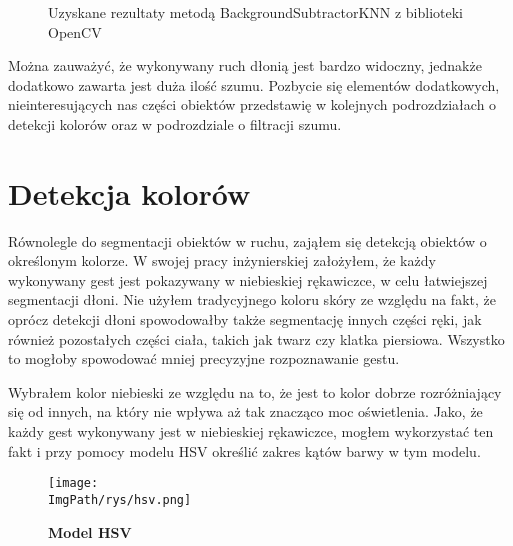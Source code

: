 \documentclass[a4paper,12pt,twoside,openany]{report}
\newcommand{\ImgPath}{.}
\begin{document}
\begin{figure}[H]
	\centering
	\caption{Uzyskane rezultaty metodą BackgroundSubtractorKNN z biblioteki OpenCV}
\end{figure}


Można zauważyć, że wykonywany ruch dłonią jest bardzo widoczny, jednakże dodatkowo zawarta jest duża ilość szumu. Pozbycie się elementów dodatkowych, nieinteresujących nas części obiektów przedstawię w kolejnych podrozdziałach o detekcji kolorów oraz w podrozdziale o filtracji szumu. 

\section{Detekcja kolorów}
Równolegle do segmentacji obiektów w ruchu, zająłem się detekcją obiektów o określonym kolorze. W swojej pracy inżynierskiej założyłem, że każdy wykonywany gest jest pokazywany w niebieskiej rękawiczce, w celu łatwiejszej segmentacji dłoni. Nie użyłem tradycyjnego koloru skóry ze względu na fakt, że oprócz detekcji dłoni spowodowałby także segmentację innych części ręki, jak również pozostałych części ciała, takich jak twarz czy klatka piersiowa. Wszystko to mogłoby spowodować mniej precyzyjne rozpoznawanie gestu.

Wybrałem kolor niebieski ze względu na to, że jest to kolor dobrze rozróżniający się od innych, na który nie wpływa aż tak znacząco moc oświetlenia.
Jako, że każdy gest wykonywany jest w niebieskiej rękawiczce, mogłem wykorzystać ten fakt i przy pomocy modelu HSV określić zakres kątów barwy w tym modelu. 

\begin{figure}[H]	
	\centering
	\texttt{[image: \\ImgPath/rys/hsv.png]}
	
	\caption{  \textbf{Model HSV}}
\end{figure}
\end{document}
